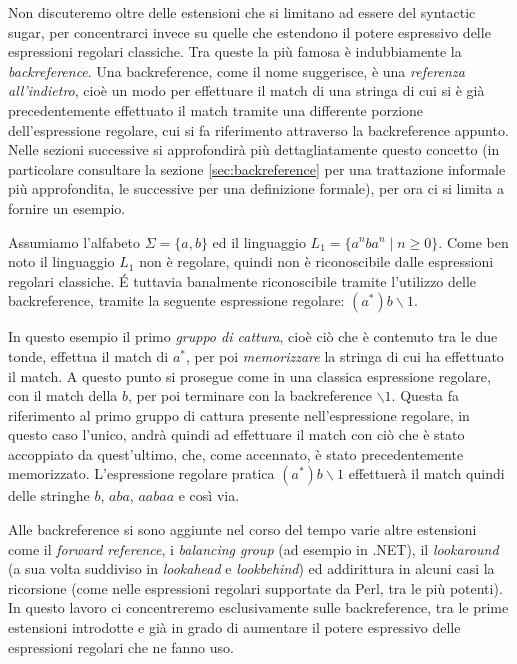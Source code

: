Non discuteremo oltre delle estensioni che si limitano ad essere del syntactic sugar, per concentrarci invece su quelle che estendono il potere espressivo delle espressioni regolari classiche. Tra queste la più famosa è indubbiamente la \textit{backreference}. Una backreference, come il nome suggerisce, è una \textit{referenza all'indietro}, cioè un modo per effettuare il match di una stringa di cui si è già precedentemente effettuato il match tramite una differente porzione dell'espressione regolare, cui si fa riferimento attraverso la backreference appunto. Nelle sezioni successive si approfondirà più dettagliatamente questo concetto (in particolare consultare la sezione \vref{sec:backreference} per una trattazione informale più approfondita, le successive per una definizione formale), per ora ci si limita a fornire un esempio.

Assumiamo l'alfabeto $\Sigma = \{a, b\}$ ed il linguaggio $L_1 = \{ a^nba^n \mid n \geq 0 \} $. Come ben noto il linguaggio $L_1$ non è regolare, quindi non è riconoscibile dalle espressioni regolari classiche. É tuttavia banalmente riconoscibile tramite l'utilizzo delle backreference, tramite la seguente espressione regolare: $(a^*)b\backslash1$.

In questo esempio il primo \textit{gruppo di cattura}, cioè ciò che è contenuto tra le due tonde, effettua il match di $a^*$, per poi \textit{memorizzare} la stringa di cui ha effettuato il match. A questo punto si prosegue come in una classica espressione regolare, con il match della $b$, per poi terminare con la backreference $\backslash1$. Questa fa riferimento al primo gruppo di cattura presente nell'espressione regolare, in questo caso l'unico, andrà quindi ad effettuare il match con ciò che è stato accoppiato da quest'ultimo, che, come accennato, è stato precedentemente memorizzato. L'espressione regolare pratica $(a^*)b\backslash1$ effettuerà il match quindi delle stringhe $b$, $aba$, $aabaa$ e così via.

Alle backreference si sono aggiunte nel corso del tempo varie altre estensioni come il \textit{forward reference}, i \textit{balancing group} (ad esempio in .NET), il \textit{lookaround} (a sua volta suddiviso in \textit{lookahead} e \textit{lookbehind}) ed addirittura in alcuni casi la ricorsione (come nelle espressioni regolari supportate da Perl, tra le più potenti). In questo lavoro ci concentreremo esclusivamente sulle backreference, tra le prime estensioni introdotte e già in grado di aumentare il potere espressivo delle espressioni regolari che ne fanno uso.

